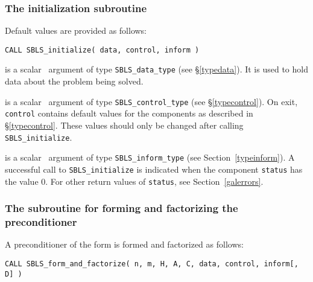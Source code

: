 \documentclass{galahad}
\newcommand{\packagename}{SBLS}
\begin{document}

\subsubsection{The initialization subroutine}\label{subinit}
 Default values are provided as follows:
\vspace*{1mm}

\hspace{8mm}
{\tt CALL \packagename\_initialize( data, control, inform )}

\vspace*{-3mm}
\begin{description}

 is a scalar \intentinout\ argument of type
{\tt \packagename\_data\_type}
(see \S\ref{typedata}). It is used to hold data about the problem being
solved.

 is a scalar \intentout\ argument of type
{\tt \packagename\_control\_type}
(see \S\ref{typecontrol}).
On exit, {\tt control} contains default values for the components as
described in \S\ref{typecontrol}.
These values should only be changed after calling
{\tt \packagename\_initialize}.

 is a scalar \intentout\ argument of type
{\tt \packagename\_inform\_type}
(see Section~\ref{typeinform}). A successful call to
{\tt \packagename\_initialize}
is indicated when the  component {\tt status} has the value 0.
For other return values of {\tt status}, see Section~\ref{galerrors}.

\end{description}


\subsubsection{The subroutine for forming and factorizing the preconditioner}
A preconditioner of the form  is formed and factorized as follows:
\vspace*{1mm}

\hspace{8mm}
{\tt CALL \packagename\_form\_and\_factorize( n, m, H, A, C, data, control, inform[, D] )}
\end{document}

